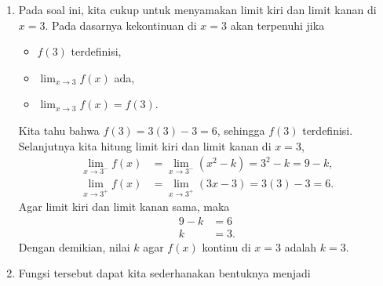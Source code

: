 \documentclass[11pt,openany,a4paper]{article}
\begin{document}
\begin{enumerate}
\begin{enumerate}
\begin{center}
                    \end{center}
          \end{enumerate}
    \item Pada soal ini, kita cukup untuk menyamakan limit kiri dan limit kanan di $x=3$. Pada dasarnya kekontinuan di $x=3$ akan terpenuhi jika
          \begin{itemize}
              \item $f(3)$ terdefinisi,
              \item $\lim_{x \to 3} f(x)$ ada,
              \item $\lim_{x \to 3} f(x) = f(3)$.
          \end{itemize}
          Kita tahu bahwa $f(3)=3(3)-3=6$, sehingga $f(3)$ terdefinisi. Selanjutnya kita hitung limit kiri dan limit kanan di $x=3$,
          \begin{align*}
              \lim_{x \to 3^-} f(x) & = \lim_{x \to 3^-} (x^2 - k) = 3^2 - k = 9 - k, \\
              \lim_{x \to 3^+} f(x) & = \lim_{x \to 3^+} (3x - 3) = 3(3) - 3 = 6.
          \end{align*}
          Agar limit kiri dan limit kanan sama, maka
          \begin{align*}
              9 - k & = 6  \\
              k     & = 3.
          \end{align*}
          Dengan demikian, nilai $k$ agar $f(x)$ kontinu di $x=3$ adalah $k=3$.
    \item Fungsi tersebut dapat kita sederhanakan bentuknya menjadi
          \begin{align*}

\end{align*}
\end{enumerate}
\end{document}
